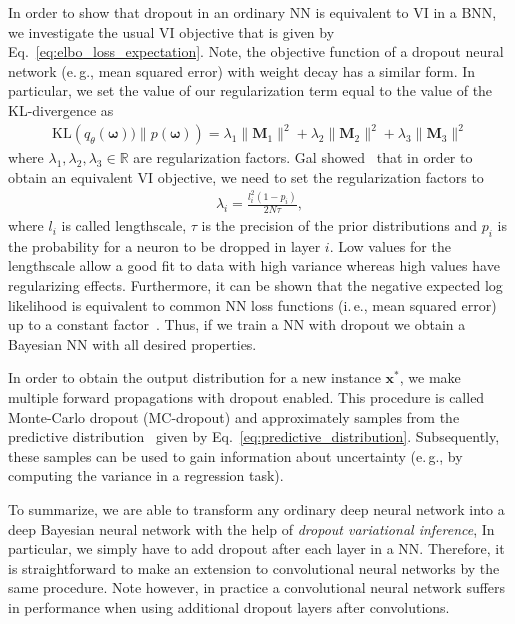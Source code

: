 \documentclass[runningheads]{llncs}
\begin{document}
In order to show that dropout in an ordinary NN is equivalent to VI in a BNN, we investigate the usual VI objective that is given by Eq.~\ref{eq:elbo_loss_expectation}.
Note, the objective function of a dropout neural network (e.\,g., mean squared error) with weight decay has a similar form.
In particular, we set the value of our regularization term equal to the value of the KL-divergence as
\begin{align}
\mathrm{KL}\left(q_\theta(\boldsymbol{\omega}))\|p(\boldsymbol{\omega})\right) = \lambda_1 \|\mathbf{M}_1\|^2+ \lambda_2 \|\mathbf{M}_2\|^2 + \lambda_3 \|\mathbf{M}_3\|^2
\end{align}
where $\lambda_1, \lambda_2, \lambda_3 \in \mathbb{R}$ are regularization factors.
Gal showed~\cite{Gal2016Uncertainty} that in order to obtain an equivalent VI objective, we need to set the regularization factors to 
\begin{align}
    \lambda_i = \frac{l_i^2 (1 - p_i)}{2 N \tau},
\end{align}
where $l_i$ is called lengthscale, $\tau$ is the precision of the prior distributions and $p_i$ is the probability for a neuron to be dropped in layer $i$. 
Low values for the lengthscale allow a good fit to data with high variance whereas high values have regularizing effects.
Furthermore, it can be shown that the negative expected log likelihood is equivalent to common NN loss functions (i.\,e., mean squared error) up to a constant factor~\cite{Gal2016Uncertainty}.
Thus, if we train a NN with dropout we obtain a Bayesian NN with all desired properties.

In order to obtain the output distribution for a new instance $\mathbf{x}^*$, we make multiple forward propagations with dropout enabled. 
This procedure is called Monte-Carlo dropout (MC-dropout) and approximately samples from the predictive distribution~\cite{Gal2016Uncertainty} given by Eq.~\ref{eq:predictive_distribution}.
Subsequently, these samples can be used to gain information about uncertainty (e.\,g., by computing the variance in a regression task).

To summarize, we are able to transform any ordinary deep neural network into a deep Bayesian neural network with the help of \textit{dropout variational inference},
In particular, we simply have to add dropout after each layer in a NN.
Therefore, it is straightforward to make an extension to convolutional neural networks by the same procedure.
Note however, in practice a convolutional neural network suffers in performance when using additional dropout layers after convolutions.
\end{document}
